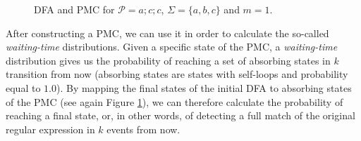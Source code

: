 \begin{figure}[!ht]
\begin{centering}
\hfill
{}
\caption{DFA and PMC for $\mathcal{P}=a ; c ; c$,  $\Sigma=\{a,b,c\}$ and $m=1$.}
\label{fig:dfa_mc_example}
\end{centering}
\end{figure}


After constructing a PMC, we can use it in order to calculate the so-called \textit{waiting-time} distributions.
Given a specific state of the PMC, a \textit{waiting-time} distribution gives us the probability of reaching a set of absorbing states in $k$ transition from now (absorbing states are states with self-loops and probability equal to $1.0$).
By mapping the final states of the initial DFA to absorbing states of the PMC
(see again Figure \ref{fig:dfa_mc_example}),
we can therefore calculate the probability of reaching a final state,
or, in other words, of detecting a full match of the original regular expression in $k$ events from now.

